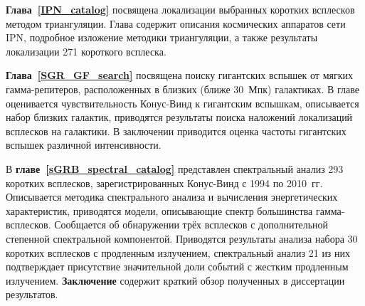 \textbf{Глава~\ref{IPN_catalog}} посвящена локализации выбранных коротких всплесков 
методом триангуляции. Глава содержит описания космических аппаратов сети IPN, 
подробное изложение методики триангуляции, а также результаты локализации 
271 короткого всплеска.  

\textbf{Глава~\ref{SGR_GF_search}} посвящена поиску гигантских вспышек от мягких
гамма-репитеров, расположенных в близких (ближе 30~Мпк) галактиках.
В главе оценивается чувствительность Конус-Винд к гигантским вспышкам, 
описывается набор близких галактик, приводятся результаты поиска наложений локализаций
всплесков на галактики. В заключении приводится оценка частоты гигантских вспышек различной 
интенсивности.

В \textbf{главе~\ref{sGRB_spectral_catalog}} представлен спектральный анализ 293
коротких всплесков, зарегистрированных Конус-Винд с 1994 по 2010~гг. 
Описывается методика спектрального анализа и вычисления энергетических характеристик,
приводятся модели, описывающие спектр большинства гамма-всплесков.
Сообщается об обнаружении трёх всплесков с дополнительной степенной спектральной
компонентой. Приводятся результаты анализа набора 30 коротких всплесков с продленным излучением, 
спектральный анализ 21 из них подтверждает присутствие значительной доли 
событий с жестким продленным излучением.   
\enlargethispage{4\baselineskip}
\textbf{Заключение} содержит краткий обзор полученных в диссертации результатов.

\clearpage
